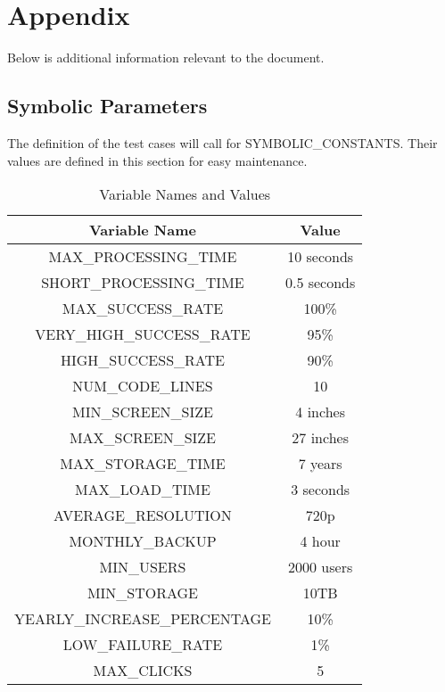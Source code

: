 \documentclass[12pt, titlepage]{article}
\begin{document}
\section{Appendix}

Below is additional information relevant to the document.

\subsection{Symbolic Parameters}

The definition of the test cases will call for SYMBOLIC\_CONSTANTS.
Their values are defined in this section for easy maintenance.

\begin{table}[h!]
  \centering
  \begin{tabular}{|c|c|}
      \hline
      \textbf{Variable Name} & \textbf{Value} \\
      \hline
      MAX\_PROCESSING\_TIME & 10 seconds \\
      \hline
      SHORT\_PROCESSING\_TIME & 0.5 seconds \\
      \hline
      MAX\_SUCCESS\_RATE & 100\% \\
      \hline
      VERY\_HIGH\_SUCCESS\_RATE & 95\% \\
      \hline
      HIGH\_SUCCESS\_RATE & 90\% \\
      \hline
      NUM\_CODE\_LINES & 10 \\
      \hline
      MIN\_SCREEN\_SIZE & 4 inches \\
      \hline
      MAX\_SCREEN\_SIZE & 27 inches \\
      \hline
      MAX\_STORAGE\_TIME & 7 years \\
      \hline
      MAX\_LOAD\_TIME & 3 seconds \\
      \hline
      AVERAGE\_RESOLUTION & 720p \\
      \hline
      MONTHLY\_BACKUP & 4 hour \\
      \hline
      MIN\_USERS & 2000 users \\
      \hline
      MIN\_STORAGE & 10TB \\
      \hline
      YEARLY\_INCREASE\_PERCENTAGE & 10\% \\
      \hline
      LOW\_FAILURE\_RATE & 1\% \\
      \hline
      MAX\_CLICKS & 5 \\
      \hline
  \end{tabular}
  \caption{Variable Names and Values}
  \label{tab:variables}
\end{table}
\end{document}
